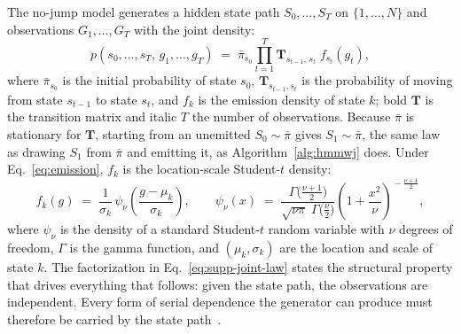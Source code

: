 The no-jump model generates a hidden state path $S_0, \dots, S_T$ on
$\{1, \dots, N\}$ and observations $G_1, \dots, G_T$ with the joint
density:
\begin{equation}
  p(s_0, \dots, s_T,\, g_1, \dots, g_T)
  \;=\; \bar\pi_{s_0} \prod_{t=1}^{T}
  \mathbf{T}_{s_{t-1},\, s_t}\; f_{s_t}(g_t),
  \label{eq:supp-joint-law}
\end{equation}
where $\bar\pi_{s_0}$ is the initial probability of state $s_0$,
$\mathbf{T}_{s_{t-1}, s_t}$ is the probability of moving from state
$s_{t-1}$ to state $s_t$, and $f_k$ is the emission density of state
$k$; bold $\mathbf{T}$ is the transition matrix and italic $T$ the
number of observations. Because $\bar\pi$ is stationary for
$\mathbf{T}$, starting from an unemitted $S_0 \sim \bar\pi$ gives
$S_1 \sim \bar\pi$, the same law as drawing $S_1$ from $\bar\pi$ and
emitting it, as Algorithm~\ref{alg:hmmwj} does. Under
Eq.~\eqref{eq:emission}, $f_k$ is the location-scale
Student-$t$ density:
\begin{equation}
  f_k(g) \;=\; \frac{1}{\sigma_k}\,
  \psi_\nu\!\left(\frac{g - \mu_k}{\sigma_k}\right),
  \qquad
  \psi_\nu(x) \;=\;
  \frac{\Gamma\!\big(\tfrac{\nu+1}{2}\big)}
       {\sqrt{\nu \pi}\; \Gamma\!\big(\tfrac{\nu}{2}\big)}
  \left(1 + \frac{x^2}{\nu}\right)^{\!-\frac{\nu+1}{2}},
  \label{eq:supp-emission-density}
\end{equation}
where $\psi_\nu$ is the density of a standard Student-$t$ random
variable with $\nu$ degrees of freedom, $\Gamma$ is the gamma
function, and $(\mu_k, \sigma_k)$ are the location and scale of state
$k$. The factorization in Eq.~\eqref{eq:supp-joint-law} states the
structural property that drives everything that follows: given the
state path, the observations are independent. Every form of serial
dependence the generator can produce must therefore be carried by the
state path~\cite{rabinerJuang1986}.

